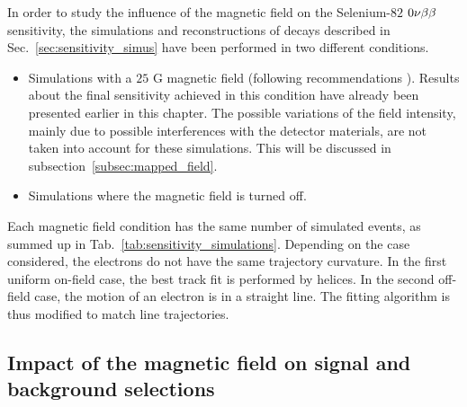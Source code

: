 In order to study the influence of the magnetic field on the Selenium-$82$ $0\nu\beta\beta$ sensitivity, the simulations and reconstructions of decays described in Sec.~\ref{sec:sensitivity_simus} have been performed in two different conditions.
\begin{itemize}
\item Simulations with a $25$ G magnetic field (following recommendations \cite{CalvezThesis}).
  Results about the final sensitivity achieved in this condition have already been presented earlier in this chapter.
  The possible variations of the field intensity, mainly due to possible interferences with the detector materials, are not taken into account for these simulations.
  This will be discussed in subsection~\ref{subsec:mapped_field}.
\item Simulations where the magnetic field is turned off.
\end{itemize}
Each magnetic field condition has the same number of simulated events, as summed up in Tab.~\ref{tab:sensitivity_simulations}.
Depending on the case considered, the electrons do not have the same trajectory curvature.
In the first uniform on-field case, the best track fit is performed by helices.
In the second off-field case, the motion of an electron is in a straight line.
The fitting algorithm is thus modified to match line trajectories.

\subsection{Impact of the magnetic field on signal and background selections}


